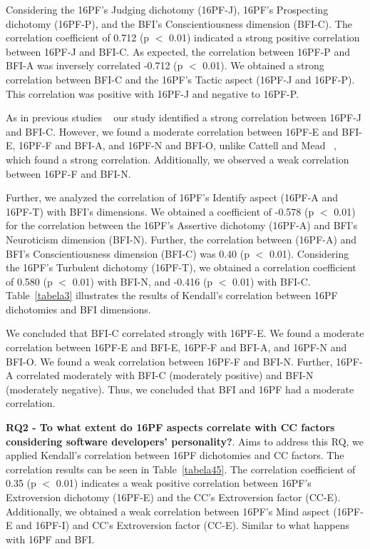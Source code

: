 Considering the 16PF's Judging dichotomy (16PF-J), 16PF's Prospecting dichotomy  (16PF-P), and the BFI's Conscientiousness dimension (BFI-C). The correlation coefficient of 0.712 (p $<$ 0.01) indicated a strong positive correlation between 16PF-J and BFI-C. As expected, the correlation between 16PF-P and BFI-A was inversely correlated -0.712 (p $<$ 0.01). We obtained a strong correlation between BFI-C and the 16PF's Tactic aspect (16PF-J and 16PF-P). This correlation was positive with 16PF-J and negative to 16PF-P.  

As in previous studies ~\cite{cattell2008sixteen,cattell1995personality, schneewind199816, gerbing199116pf} our study identified a strong correlation between 16PF-J and BFI-C.  However, we found a moderate correlation between 16PF-E and BFI-E, 16PF-F and BFI-A, and 16PF-N and BFI-O, unlike Cattell and Mead ~\cite{cattell2008sixteen}, which found a strong correlation. Additionally, we observed a weak correlation between 16PF-F and BFI-N. 

Further, we analyzed the correlation of 16PF's Identify aspect (16PF-A and 16PF-T) with BFI's dimensions. We obtained a coefficient of -0.578 (p $<$ 0.01) for the correlation between the 16PF's Assertive dichotomy (16PF-A) and BFI's Neuroticism dimension (BFI-N). Further, the correlation between (16PF-A) and BFI's Conscientiousness dimension (BFI-C) was 0.40 (p $<$ 0.01). Considering the 16PF's Turbulent dichotomy (16PF-T), we obtained a correlation coefficient of 0.580 (p $<$ 0.01) with BFI-N, and -0.416 (p $<$ 0.01) with BFI-C. Table~\ref{tabela3} illustrates the results of Kendall’s correlation between 16PF dichotomies and BFI dimensions. 
 
We concluded that BFI-C correlated strongly with 16PF-E. We found a moderate correlation between 16PF-E and BFI-E, 16PF-F and BFI-A, and 16PF-N and BFI-O. We found a weak correlation between 16PF-F and BFI-N. Further, 16PF-A correlated moderately with BFI-C (moderately positive) and BFI-N (moderately negative). Thus, we concluded that BFI and 16PF had a moderate correlation. 


\textbf{RQ2 - To what extent do 16PF aspects correlate with CC factors considering software developers’ personality?}.
Aims to address this RQ, we applied Kendall’s correlation between 16PF dichotomies and CC factors. The correlation results can be seen in Table~\ref{tabela45}. The correlation coefficient of 0.35 (p $<$  0.01) indicates a weak positive correlation between 16PF's Extroversion dichotomy (16PF-E) and the CC's Extroversion factor (CC-E). Additionally, we obtained a weak correlation between 16PF's Mind aspect (16PF-E and 16PF-I) and CC's Extroversion factor (CC-E).
Similar to what happens with 16PF and BFI.

